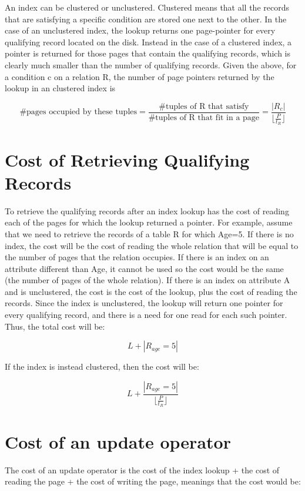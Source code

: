 \documentclass[11pt]{article}
\begin{document}
An index can be clustered or unclustered. Clustered means that all the records that are satisfying a specific condition are stored one next to the other. In the case of an unclustered index, the lookup returns one page-pointer for every qualifying record located on the disk. Instead in the case of a clustered index, a pointer is returned for those pages that contain the qualifying records, which is clearly much smaller than the number of qualifying records. Given the above, for a condition c on a relation R, the number of page pointers returned by the lookup in an clustered index is

$$
\text{\# pages occupied by these tuples} = \frac{\text{\# tuples of R that satisfy}}{\text{\# tuples of R that fit in a page}} = \frac{ |R_c| }{\lfloor\frac{P}{t_R}\rfloor}
$$

\section{Cost of Retrieving Qualifying Records}
To retrieve the qualifying records after an index lookup has the cost of reading each of the pages for which the lookup returned a pointer. For example, assume that we need to retrieve the records of a table R for which Age=5. If there is no index, the cost will be the cost of reading the whole relation that will be equal to the number of pages that the relation occupies. If there is an index on an attribute different than Age, it cannot be used so the cost would be the same (the number of pages of the whole relation). If there is an index on attribute A and is unclustered, the cost is the cost of the lookup, plus the cost of reading the records. Since the index is unclustered, the lookup will return one pointer for every qualifying record, and there is a need for one read for each such pointer. Thus, the total cost will be:

$$
L + |R_{age}=5|
$$

If the index is instead clustered, then the cost will be:

$$
L + \frac{ |R_{age}=5| }{\lfloor\frac{P}{t_R}\rfloor}
$$

\section{Cost of an update operator}

The cost of an update operator is the cost of the index lookup + the cost of reading the page + the cost of writing the page, meanings that the cost would be:
\end{document}

